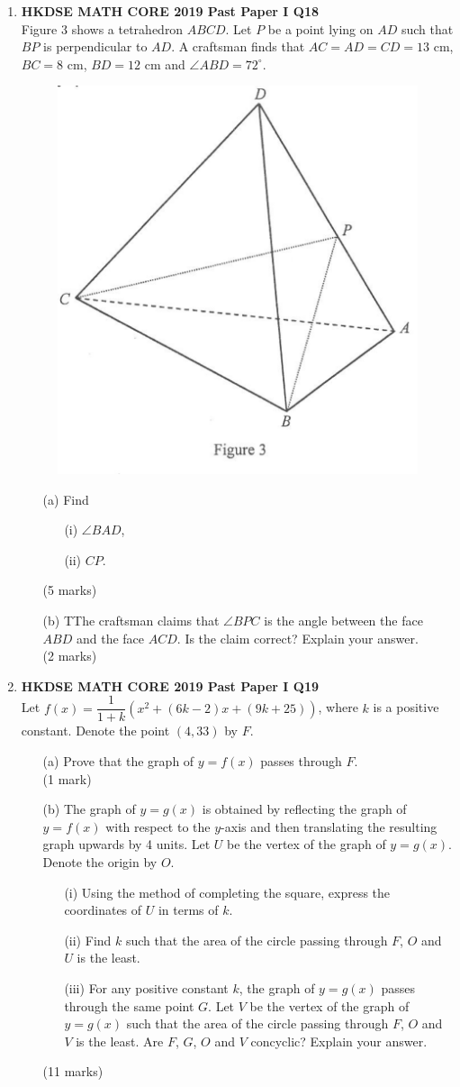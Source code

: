 \documentclass[12pt]{article}
\begin{document}
\begin{enumerate}
	\item \textbf{HKDSE MATH CORE 2019 Past Paper I Q18}\\
	Figure 3 shows a tetrahedron $ABCD$. Let $P$ be a point lying on $AD$ such that $BP$ is perpendicular to $AD$. A craftsman finds that $AC = AD = CD = 13$ cm, $BC = 8$ cm, $BD = 12$ cm and $\angle ABD = 72^\circ$.
	\begin{figure}[H]
		\centering
		\includegraphics[width = .3\linewidth]{2019Figure1.3}
	\end{figure}
	\begin{enumerate}
		\item[(a)] Find
		\begin{enumerate}
			\item[(i)] $\angle BAD$,
			\item[(ii)] $CP$.
		\end{enumerate}
		(5 marks)
		\item[(b)] TThe craftsman claims that $\angle BPC$ is the angle between the face $ABD$ and the face $ACD$. Is the claim correct? Explain your answer. \\(2 marks)
	\end{enumerate}

	\item \textbf{HKDSE MATH CORE 2019 Past Paper I Q19}\\
	Let $f(x) = \dfrac{1}{1 + k}(x^2 + (6k - 2)x + (9k + 25))$, where $k$ is a positive constant. Denote the point $(4, 33)$ by $F$.
	\begin{enumerate}
		\item[(a)] Prove that the graph of $y = f(x)$ passes through $F$. \\(1 mark)
		\item[(b)] The graph of $y = g(x)$ is obtained by reflecting the graph of $y = f(x)$ with respect to the $y$-axis and then translating the resulting graph upwards by 4 units. Let $U$ be the vertex of the graph of $y = g(x)$. Denote the origin by $O$.
		\begin{enumerate}
			\item[(i)] Using the method of completing the square, express the coordinates of $U$ in terms of $k$.
			\item[(ii)] Find $k$ such that the area of the circle passing through $F$, $O$ and $U$ is the least.
			\item[(iii)] For any positive constant $k$, the graph of $y = g(x)$ passes through the same point $G$. Let $V$ be the vertex of the graph of $y = g(x)$ such that the area of the circle passing through $F$, $O$ and $V$ is the least. Are $F$, $G$, $O$ and $V$ concyclic? Explain your answer.
		\end{enumerate}
		(11 marks)
	\end{enumerate}


\end{enumerate}
\end{document}
